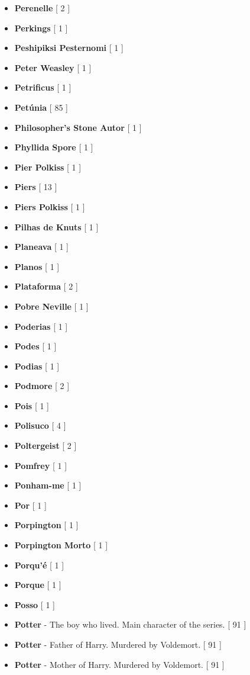 \documentclass[a4paper]{article}
\begin{document}
{\begin{itemize}
	\item \textbf{Perenelle} [ 2 ]
	\item \textbf{Perkings} [ 1 ]
	\item \textbf{Peshipiksi Pesternomi} [ 1 ]
	\item \textbf{Peter Weasley} [ 1 ]
	\item \textbf{Petrificus} [ 1 ]
	\item \textbf{Petúnia} [ 85 ]
	\item \textbf{Philosopher's Stone Autor} [ 1 ]
	\item \textbf{Phyllida Spore} [ 1 ]
	\item \textbf{Pier Polkiss} [ 1 ]
	\item \textbf{Piers} [ 13 ]
	\item \textbf{Piers Polkiss} [ 1 ]
	\item \textbf{Pilhas de Knuts} [ 1 ]
	\item \textbf{Planeava} [ 1 ]
	\item \textbf{Planos} [ 1 ]
	\item \textbf{Plataforma} [ 2 ]
	\item \textbf{Pobre Neville} [ 1 ]
	\item \textbf{Poderias} [ 1 ]
	\item \textbf{Podes} [ 1 ]
	\item \textbf{Podias} [ 1 ]
	\item \textbf{Podmore} [ 2 ]
	\item \textbf{Pois} [ 1 ]
	\item \textbf{Polisuco} [ 4 ]
	\item \textbf{Poltergeist} [ 2 ]
	\item \textbf{Pomfrey} [ 1 ]
	\item \textbf{Ponham-me} [ 1 ]
	\item \textbf{Por} [ 1 ]
	\item \textbf{Porpington} [ 1 ]
	\item \textbf{Porpington Morto} [ 1 ]
	\item \textbf{Porqu'é} [ 1 ]
	\item \textbf{Porque} [ 1 ]
	\item \textbf{Posso} [ 1 ]
	\item \textbf{Potter} - The boy who lived. Main character of the series. [ 91 ]
	\item \textbf{Potter} - Father of Harry. Murdered by Voldemort. [ 91 ]
	\item \textbf{Potter} - Mother of Harry. Murdered by Voldemort. [ 91 ]

\end{itemize}}
\end{document}
